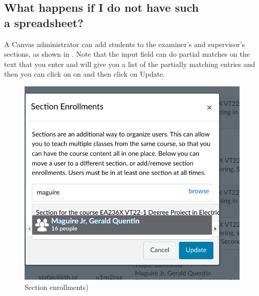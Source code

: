 \subsection[What happens if I do not have such a spreadsheet?]{What happens if I do not have such\\ a spreadsheet?}

A Canvas administrator can add students to the examiner’s and supervisor’s sections, as shown in . Note that the input field can do partial matches on the text that you enter and will give you a list of the partially matching entries and then you can click on on and then click on Update. 
 	
\begin{figure}[!ht]
  \begin{center}
    \includegraphics[width=0.99\textwidth]{README_notes/README-examiner-figures/edit-sections-Screenshot_20220325_161529.png}
  \end{center}
  \caption{Section enrollments)}
  \label{fig:sectionEntrollments}
\end{figure}
\FloatBarrier

